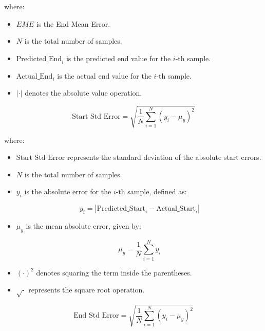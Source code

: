 \documentclass[12pt]{report}
\begin{document}
where:
\begin{itemize}
	\item \( EME \) is the End Mean Error.
	\item \( N \) is the total number of samples.
	\item \( \text{Predicted\_End}_i \) is the predicted end value for the \( i \)-th sample.
	\item \( \text{Actual\_End}_i \) is the actual end value for the \( i \)-th sample.
	\item \( |\cdot| \) denotes the absolute value operation.
\end{itemize}

\begin{equation}
	\text{Start Std Error} = \sqrt{\frac{1}{N} \sum_{i=1}^{N} \left( y_i - \mu_y \right)^2}
	\label{eq:start_std_error}
\end{equation}

where:
\begin{itemize}
	\item \(\text{Start Std Error}\) represents the standard deviation of the absolute start errors.
	\item \( N \) is the total number of samples.
	\item \( y_i \) is the absolute error for the \( i \)-th sample, defined as:
	
	\[
	y_i = |\text{Predicted\_Start}_i - \text{Actual\_Start}_i|
	\]
	
	\item \( \mu_y \) is the mean absolute error, given by:
	
	\[
	\mu_y = \frac{1}{N} \sum_{i=1}^{N} y_i
	\]
	
	\item \( (\cdot)^2 \) denotes squaring the term inside the parentheses.
	\item \( \sqrt{\cdot} \) represents the square root operation.
\end{itemize}
\begin{equation}
	\text{End Std Error} = \sqrt{\frac{1}{N} \sum_{i=1}^{N} \left( y_i - \mu_y \right)^2}
	\label{eq:end_std_error}
\end{equation}
\end{document}
